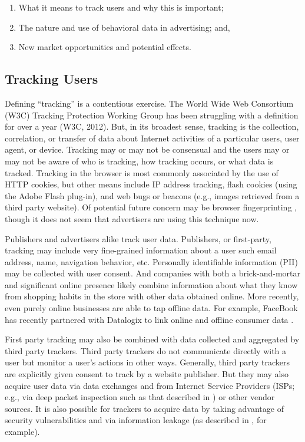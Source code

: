 \begin{enumerate}
\item What it means to track users and why this is important;
\item The nature and use of behavioral data in advertising; and,
\item New market opportunities and potential effects.
\end{enumerate}


\subsection{Tracking Users}
\label{trackingusers}

Defining ``tracking'' is a contentious exercise. The World Wide Web Consortium (W3C) Tracking Protection Working Group has been struggling with a definition for over a year (W3C, 2012). But, in its broadest sense, tracking is the collection, correlation, or transfer of data about Internet activities of a particular users, user agent, or device. Tracking may or may not be consensual and the users may or may not be aware of who is tracking, how tracking occurs, or what data is tracked. Tracking in the browser is most commonly associated by the use of HTTP cookies, but other means include IP address tracking, flash cookies (using the Adobe Flash plug-in), and web bugs or beacons (e.g., images retrieved from a third party website). Of potential future concern may be browser fingerprinting  \citep{Eckersley:2010uj},  though it does not seem that advertisers are using this technique now.

Publishers and advertisers alike track user data. Publishers, or first-party, tracking may include very fine-grained information about a user such email address, name, navigation behavior, etc. Personally identifiable information (PII) may be collected with user consent. And companies with both a brick-and-mortar and significant online presence likely combine information about what they know from shopping habits in the store with other data obtained online. More recently, even purely online businesses are able to tap offline data. For example, FaceBook has recently partnered with Datalogix to link online and offline consumer data  \citep{Reitman:2012wc}. 

First party tracking may also be combined with data collected and aggregated by third party trackers. Third party trackers do not communicate directly with a user but monitor a user's actions in other ways. Generally, third party trackers are explicitly given consent to track by a website publisher. But they may also acquire user data via data exchanges and from Internet Service Providers (ISPs; e.g., via deep packet inspection such as that described in  \citealp{Sesto:2008va})  or other vendor sources. It is also possible for trackers to acquire data by taking advantage of security vulnerabilities and via information leakage (as described in  \citealp{Krishnamurthy:2009vh},  for example).

